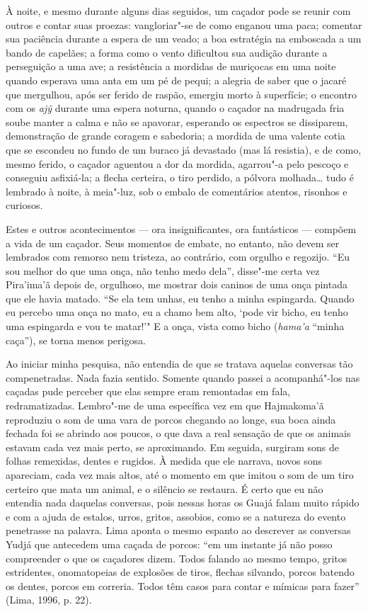 À noite, e mesmo durante alguns dias seguidos, um caçador pode se reunir
com outros e contar suas proezas: vangloriar"-se de como enganou uma
paca; comentar sua paciência durante a espera de um veado; a boa
estratégia na emboscada a um bando de capelães; a forma como o vento
dificultou sua audição durante a perseguição a uma ave; a resistência a
mordidas de muriçocas em uma noite quando esperava uma anta em um pé de
pequi; a alegria de saber que o jacaré que mergulhou, após ser ferido de
raspão, emergiu morto à superfície; o encontro com os \emph{ajỹ} durante
uma espera noturna, quando o caçador na madrugada fria soube manter a
calma e não se apavorar, esperando os espectros se dissiparem,
demonstração de grande coragem e sabedoria; a mordida de uma valente
cotia que se escondeu no fundo de um buraco já devastado (mas lá
resistia), e de como, mesmo ferido, o caçador aguentou a dor da mordida,
agarrou"-a pelo pescoço e conseguiu asfixiá-la; a flecha certeira, o tiro
perdido, a pólvora molhada\ldots{} tudo é lembrado à noite, à meia"-luz, sob o
embalo de comentários atentos, risonhos e curiosos.

Estes e outros acontecimentos --- ora insignificantes, ora fantásticos ---
compõem a vida de um caçador. Seus momentos de embate, no entanto, não
devem ser lembrados com remorso nem tristeza, ao contrário, com orgulho
e regozijo. ``Eu sou melhor do que uma onça, não tenho medo dela'',
disse"-me certa vez Pira'ima'ã depois de, orgulhoso, me mostrar dois
caninos de uma onça pintada que ele havia matado. ``Se ela tem unhas, eu
tenho a minha espingarda. Quando eu percebo uma onça no mato, eu a chamo
bem alto, `pode vir bicho, eu tenho uma espingarda e vou te matar!'" E
a onça, vista como bicho (\emph{hama'a} ``minha caça''), se torna menos
perigosa.

Ao iniciar minha pesquisa, não entendia de que se tratava aquelas
conversas tão compenetradas. Nada fazia sentido. Somente quando passei a
acompanhá"-los nas caçadas pude perceber que elas sempre eram remontadas
em fala, redramatizadas. Lembro"-me de uma específica vez em que
Hajmakoma'ã reproduziu o som de uma vara de porcos chegando ao longe,
sua boca ainda fechada foi se abrindo aos poucos, o que dava a real
sensação de que os animais estavam cada vez mais perto, se aproximando.
Em seguida, surgiram sons de folhas remexidas, dentes e rugidos. À
medida que ele narrava, novos sons apareciam, cada vez mais altos, até o
momento em que imitou o som de um tiro certeiro que mata um animal, e o
silêncio se restaura. É certo que eu não entendia nada daquelas
conversas, pois nessas horas os Guajá falam muito rápido e com a ajuda
de estalos, urros, gritos, assobios, como se a natureza do evento
penetrasse na palavra. Lima aponta o mesmo espanto ao descrever as
conversas Yudjá que antecedem uma caçada de porcos: ``em um instante já
não posso compreender o que os caçadores dizem. Todos falando ao mesmo
tempo, gritos estridentes, onomatopeias de explosões de tiros, flechas
silvando, porcos batendo os dentes, porcos em correria. Todos têm casos
para contar e mímicas para fazer'' (Lima, 1996, p. 22).

